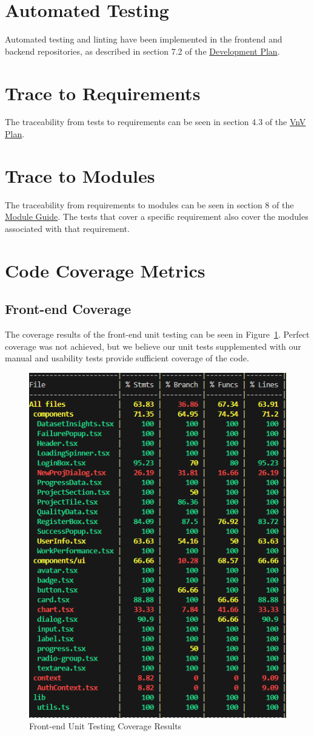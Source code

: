 \documentclass[12pt, titlepage]{article}
\begin{document}
\section{Automated Testing}
Automated testing and linting have been implemented in the frontend and backend repositories, as described in section 7.2 of the \href{https://github.com/OKKM-insights/OKKM.insights/blob/main/docs/DevelopmentPlan/DevelopmentPlan.pdf}{Development Plan}.

		
\section{Trace to Requirements}
The traceability from tests to requirements can be seen in section 4.3 of the \href{https://github.com/OKKM-insights/OKKM.insights/blob/main/docs/VnVPlan/VnVPlan.pdf}{VnV Plan}.
		
\section{Trace to Modules}
The traceability from requirements to modules can be seen in section 8 of the \href{https://github.com/OKKM-insights/OKKM.insights/blob/main/docs/Design/SoftArchitecture/MG.pdf}{Module Guide}. The tests that cover a specific requirement also cover the modules associated with that requirement.	

\section{Code Coverage Metrics}
\subsection{Front-end Coverage}
The coverage results of the front-end unit testing can be seen in Figure~\ref{fig:FE_coverage}. Perfect coverage was not achieved, but we believe our unit tests supplemented with our manual and usability tests provide sufficient coverage of the code.
\begin{figure}[H]
    \centering
    \includegraphics[width=0.5\linewidth]{FE_coverage.png}
    \caption{Front-end Unit Testing Coverage Results}
    \label{fig:FE_coverage}
\end{figure}
\end{document}
